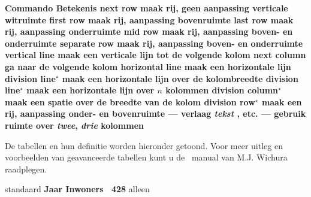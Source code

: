 {\steltabellenin[korps=klein]
\starttabel[|l|l|l|]
\HL
\NC \bf Commando  \NC \NC \bf Betekenis \NC\SR
\HL
\NC \type{\NR}        \NC next row
    \NC maak rij, geen aanpassing verticale witruimte \NC\FR
\NC \type{\FR}        \NC first row
    \NC maak rij, aanpassing bovenruimte \NC\MR
\NC \type{\LR}        \NC last row
    \NC maak rij, aanpassing onderruimte  \NC\MR
\NC \type{\MR}        \NC mid row
    \NC maak rij, aanpassing boven- en onderruimte \NC\MR
\NC \type{\SR}        \NC separate row
    \NC maak rij, aanpassing boven- en onderruimte \NC\MR
\NC \type{\VL}        \NC vertical line
    \NC maak een verticale lijn tot de volgende kolom \NC\MR
\NC \type{\NC}        \NC next column
    \NC ga naar de volgende kolom \NC\MR
\NC \type{\HL}        \NC horizontal line
    \NC maak een horizontale lijn \NC\MR
\NC \type{\DL}        \NC division line$^\star$
    \NC maak een horizontale lijn over de kolombreedte \NC\MR
\NC \type{\DL[n]}     \NC division line$^\star$
    \NC maak een horizontale lijn over $n$ kolommen \NC\MR
\NC \type{\DC}        \NC division column$^\star$
    \NC maak een spatie over de breedte van de kolom \NC\MR
\NC \type{\DR} \NC division row$^\star$
    \NC maak een rij, aanpassing onder- en bovenruimte \NC\MR
\NC {} \NC ---
    \NC verlaag {\em tekst} \NC\MR
\NC \type{\TWO}, \type{\THREE} etc.  \NC ---
    \NC gebruik ruimte over {\em twee}, {\em drie} kolommen \NC\LR
\HL
\NC {}  \NC\FR
\stoptabel}

De tabellen en hun definitie worden hieronder getoond. Voor
meer uitleg en voorbeelden van geavanceerde tabellen kunt u
de \TABLE\ manual van M.J. Wichura raadplegen.

\startbuffer
{}
{
  {standaard}
  {\starttabel[|c|c|]%
   \HL
   \VL \bf Jaar \VL \bf Inwoners \VL\NR
   \HL
    \VL  ~428 \VL\NR
     \VL\NR
     \VL\NR
     \VL\NR
   \HL
   \stoptabel}
  {alleen \type{\NR}}
\stopcombinatie}
\stopbuffer

\typebuffer


